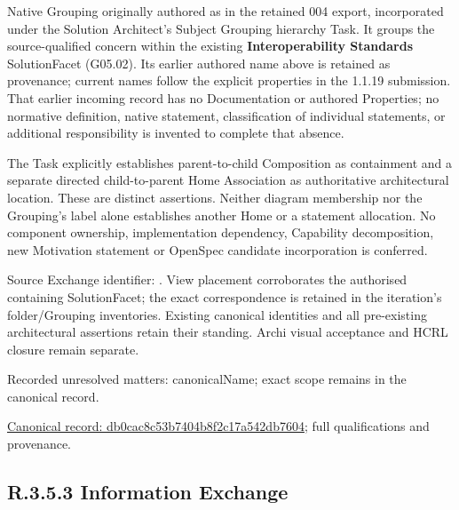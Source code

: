 Native Grouping originally authored as \texttt{} in the retained 004 export,
incorporated under the Solution Architect's Subject Grouping hierarchy Task.
It groups the source-qualified \texttt{} concern within
the existing \textbf{Interoperability Standards} SolutionFacet (G05.02). Its earlier authored name above is retained as provenance; current names
follow the explicit properties in the 1.1.19 submission.
That earlier incoming record has no Documentation or authored Properties; no normative
definition, native statement, classification of individual statements, or
additional responsibility is invented to complete that absence.



The Task explicitly establishes parent-to-child Composition as containment and
a separate directed child-to-parent Home Association as authoritative architectural
location. These are distinct assertions. Neither diagram membership nor the
Grouping's label alone establishes another Home or a statement allocation.
No component ownership, implementation dependency, Capability decomposition,
new Motivation statement or OpenSpec candidate incorporation is conferred.



Source Exchange identifier: \texttt{}. View placement corroborates
the authorised containing SolutionFacet; the exact correspondence is retained in the
iteration's folder/Grouping inventories. Existing canonical identities and all
pre-existing architectural assertions retain their standing. Archi visual
acceptance and HCRL closure remain separate.


{\small Recorded unresolved matters: canonicalName; exact scope remains in the canonical record.}\par
{\footnotesize \href{../../../../../../../continuum/grouping/db0cac8c53b7404b8f2c17a542db7604.md}{Canonical record: db0cac8c53b7404b8f2c17a542db7604}; full qualifications and provenance.}\par
\subsection*{R.3.5.3 Information Exchange}
\label{navigation:R.3.5.3}

